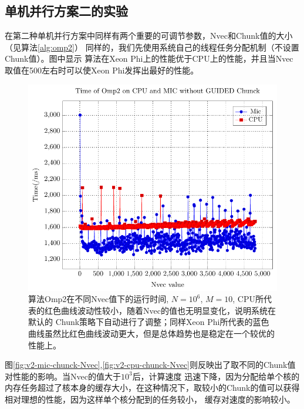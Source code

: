 \subsection{单机并行方案二的实验} %
\label{sub:bsV2}
在第二种单机并行方案中同样有两个重要的可调节参数，Nvec和Chunk值的大小（见算法\ref{alg:omp2}）
同样的，我们先使用系统自己的线程任务分配机制（不设置Chunk值）。图\label{fig:v2-Nvec}中显示
算法在Xeon Phi上的性能优于CPU上的性能，并且当Nvec取值在500左右时可以使Xeon Phi发挥出最好的性能。
\begin{figure}[!t]
   \centering
   \includegraphics[width=\textwidth]{chap5/Figures/bsV2-6-mic-cpu-Time-Chunck-0.pdf}
   \caption{算法Omp2在不同Nvec值下的运行时间, $N=10^6$, $M=10$, CPU所代表的红色曲线波动性较小，随着Nvec的值也无明显变化，说明系统在默认的
   Chunk策略下自动进行了调整；同样Xeon Phi所代表的蓝色曲线虽然比红色曲线波动更大，但是总体趋势也是稳定在一个较优的性能上。}
   \label{fig:v2-Nvec}
\end{figure}
图\ref{fig:v2-mic-chunck-Nvec},\ref{fig:v2-cpu-chunck-Nvec}则反映出了取不同的Chunk值对性能的影响。当Nvec的值大于$10^3$后，计算速度
迅速下降，因为分配给单个核的内存任务超过了核本身的缓存大小，在这种情况下，取较小的Chunk的值可以获得相对理想的性能，因为这样单个核分配到的任务较小，
缓存对速度的影响较小。
